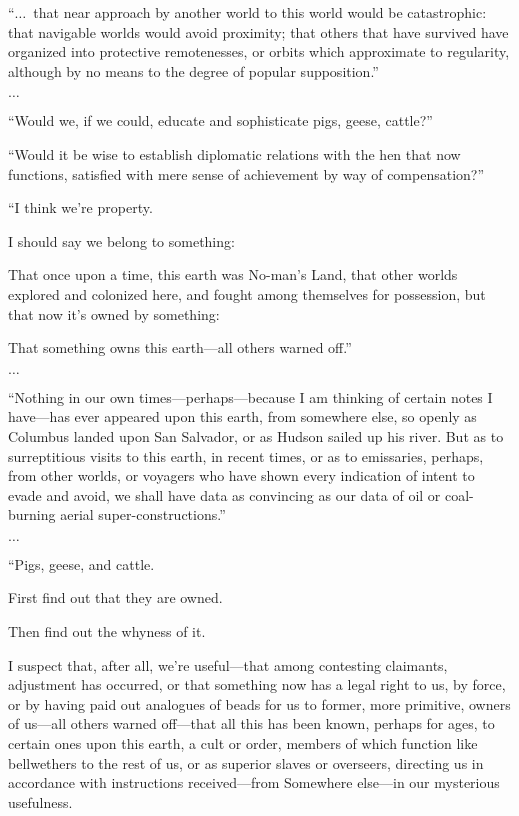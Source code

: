 \begin{svgraybox}
``$\ldots$~that near approach by another world to this world would be catastrophic:
that navigable worlds would avoid proximity;
that others that have survived have organized into protective remotenesses,
or orbits which approximate to regularity, although by no means to the degree of popular supposition.''

$\ldots$

``Would we, if we could, educate and sophisticate pigs, geese, cattle?''

``Would it be wise to establish diplomatic relations with the hen that now functions,
satisfied with mere sense of achievement by way of compensation?''


``I think we're property.

I should say we belong to something:

That once upon a time, this earth was No-man's Land, that other worlds explored and colonized here,
and fought among themselves for possession, but that now it's owned by something:

That something owns this earth---all others warned off.''

$\ldots$

``Nothing in our own times---perhaps---because I am thinking of certain notes I have---has ever appeared upon this earth, from somewhere else,
so openly as Columbus landed upon San Salvador, or as Hudson sailed up his river.
 But as to surreptitious visits to this earth, in recent times, or as to emissaries, perhaps, from other worlds,
or voyagers who have shown every indication of intent to evade and avoid,
we shall have data as convincing as our data of oil or coal-burning aerial super-constructions.''


$\ldots$

``Pigs, geese, and cattle.

First find out that they are owned.

Then find out the whyness of it.

I suspect that, after all, we're useful---that among contesting claimants, adjustment has occurred,
 or that something now has a legal right to us, by force,
or by having paid out analogues of beads for us to former, more primitive,
owners of us---all others warned off---that all this has been known, perhaps for ages, to certain ones upon this earth,
a cult or order, members of which function like bellwethers
 to the rest of us, or as superior slaves or overseers,
directing us in accordance with instructions received---from Somewhere else---in our mysterious usefulness.


\end{svgraybox}
